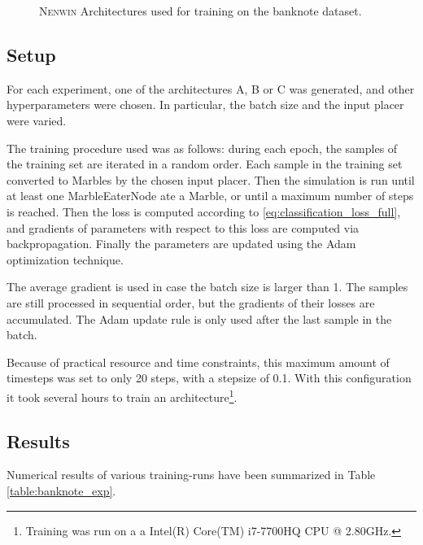 \begin{figure}
	\caption{\textsc{Nenwin} Architectures used for training on the banknote dataset.}
	\label{fig:banknote_architectures}
\end{figure}

\subsection{Setup}
For each experiment, one of the architectures A, B or C was generated, and other hyperparameters were chosen.
In particular, the batch size and the input placer were varied. 

The training procedure used was as follows:
during each epoch, the samples of the training set are iterated in a random order. 
Each sample in the training set converted to Marbles by the chosen input placer.
Then the simulation is run until at least one MarbleEaterNode ate a Marble, 
or until a maximum number of steps is reached. 
Then the loss is computed according to \eqref{eq:classification_loss_full},
and gradients of parameters with respect to this loss are computed via backpropagation.
Finally the parameters are updated using the Adam optimization technique.

The average gradient is used in case the batch size is larger than 1. 
The samples are still processed in sequential order, but the gradients of their losses are accumulated.
The Adam update rule is only used after the last sample in the batch.

Because of practical resource and time constraints, this maximum amount of timesteps was set to only 20 steps, with a stepsize of 0.1. 
With this configuration it took several hours to train an architecture\footnote{Training was run on a a Intel(R) Core(TM) i7-7700HQ CPU @ 2.80GHz.}. 

\subsection{Results}

Numerical results of various training-runs have been summarized in Table \ref{table:banknote_exp}. 

